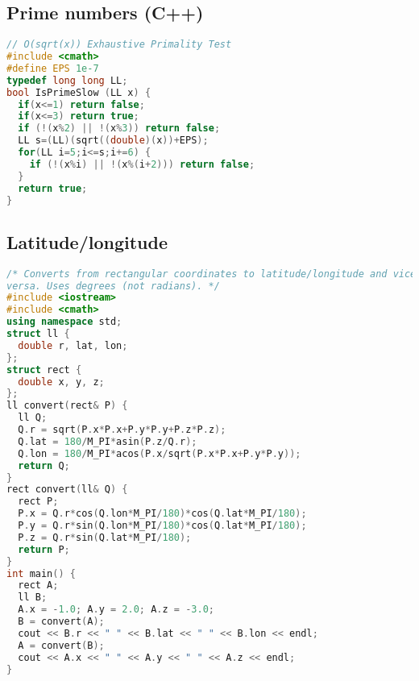 \subsection{Prime numbers (C++)}
\begin{lstlisting}[language=C++]
// O(sqrt(x)) Exhaustive Primality Test
#include <cmath>
#define EPS 1e-7
typedef long long LL;
bool IsPrimeSlow (LL x) {
  if(x<=1) return false;
  if(x<=3) return true;
  if (!(x%2) || !(x%3)) return false;
  LL s=(LL)(sqrt((double)(x))+EPS);
  for(LL i=5;i<=s;i+=6) {
    if (!(x%i) || !(x%(i+2))) return false;
  }
  return true;
}
\end{lstlisting}
\subsection{Latitude/longitude}
\begin{lstlisting}[language=C++]
/* Converts from rectangular coordinates to latitude/longitude and vice
versa. Uses degrees (not radians). */
#include <iostream>
#include <cmath>
using namespace std;
struct ll {
  double r, lat, lon;
};
struct rect {
  double x, y, z;
};
ll convert(rect& P) {
  ll Q;
  Q.r = sqrt(P.x*P.x+P.y*P.y+P.z*P.z);
  Q.lat = 180/M_PI*asin(P.z/Q.r);
  Q.lon = 180/M_PI*acos(P.x/sqrt(P.x*P.x+P.y*P.y));
  return Q;
}
rect convert(ll& Q) {
  rect P;
  P.x = Q.r*cos(Q.lon*M_PI/180)*cos(Q.lat*M_PI/180);
  P.y = Q.r*sin(Q.lon*M_PI/180)*cos(Q.lat*M_PI/180);
  P.z = Q.r*sin(Q.lat*M_PI/180);
  return P;
}
int main() {
  rect A;
  ll B;
  A.x = -1.0; A.y = 2.0; A.z = -3.0;
  B = convert(A);
  cout << B.r << " " << B.lat << " " << B.lon << endl;
  A = convert(B);
  cout << A.x << " " << A.y << " " << A.z << endl;
}

\end{lstlisting}
